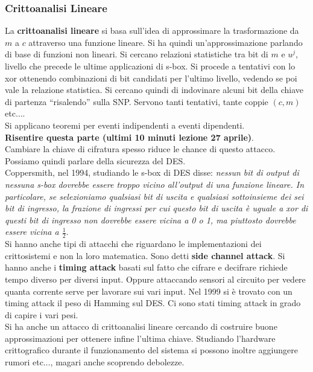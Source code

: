 \documentclass[a4paper,12pt, oneside]{book}
\begin{document}
\subsubsection{Crittoanalisi Lineare}
La \textbf{crittoanalisi lineare} si basa sull'idea di approssimare la
trasformazione da $m$ a $c$ attraverso una funzione lineare. Si ha quindi
un'approssimazione parlando di base di funzioni non lineari. Si cercano
relazioni 
statistiche tra bit di $m$ e $u^j$, livello che precede le ultime applicazioni
di s-box. Si procede a tentativi con lo xor ottenendo combinazioni di bit
candidati per l'ultimo livello, vedendo se poi vale la relazione statistica. Si
cercano quindi di indovinare alcuni bit della chiave di partenza ``risalendo''
sulla SNP. Servono tanti tentativi, tante coppie $(c,m)$ etc$\ldots$.\\
Si applicano teoremi per eventi indipendenti a eventi dipendenti.\\
\textbf{Risentire questa parte (ultimi 10 minuti lezione 27 aprile)}.\\
Cambiare la chiave di cifratura spesso riduce le chance di questo attacco.\\
Possiamo quindi parlare della sicurezza del DES. \\
Coppersmith, nel 1994, studiando le s-box di DES disse: \textit{nessun
  bit di 
output di nessuna s-box dovrebbe essere troppo vicino all'output di una funzione
lineare. In particolare, se selezioniamo qualsiasi bit di uscita e qualsiasi
sottoinsieme dei sei bit di ingresso, la frazione di ingressi per cui questo bit
di uscita è uguale a xor di questi bit di ingresso non dovrebbe essere vicina a
0 o 1, ma piuttosto dovrebbe essere vicina a $\frac{1}{2}$}.\\
Si hanno anche tipi di attacchi che riguardano le implementazioni dei
crittosistemi e non la loro matematica. Sono detti \textbf{side channel attack}.
Si hanno anche i \textbf{timing attack} basati sul fatto che cifrare e decifrare
richiede tempo diverso per diversi input. Oppure attaccando sensori al circuito
per vedere quanta corrente serve per lavorare sui vari input. Nel 1999 si è
trovato con un timing attack il peso di Hamming sul DES. Ci sono stati timing
attack in grado di capire i vari pesi.\\ Si ha anche un attacco
di crittoanalisi lineare cercando di costruire buone approssimazioni per
ottenere infine l'ultima chiave. Studiando l'hardware crittografico durante il
funzionamento del sistema si possono inoltre aggiungere rumori etc$\ldots$,
magari anche scoprendo debolezze.\\
\end{document}
